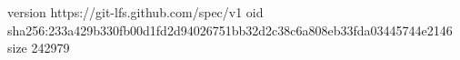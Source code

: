 version https://git-lfs.github.com/spec/v1
oid sha256:233a429b330fb00d1fd2d94026751bb32d2c38c6a808eb33fda03445744e2146
size 242979

